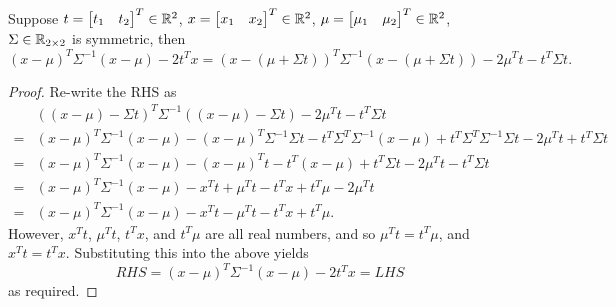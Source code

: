\documentclass[11pt,fleqn]{book} %
\begin{document}
\begin{lemma} \label{lemma:2103}
Suppose \(t = \begin{bmatrix}t_1 & t_2\end{bmatrix}^T \in \mathbb{R}^2\), \(x = \begin{bmatrix}x_1 & x_2\end{bmatrix}^T \in \mathbb{R}^2\), \(\mu = \begin{bmatrix}\mu_1 & \mu_2\end{bmatrix}^T \in \mathbb{R}^2\), \(\Sigma \in \mathbb{R}_{2\times2}\) is symmetric, then
\[
(x - \mu)^T\Sigma^{-1}(x - \mu) - 2t^Tx = (x - (\mu + \Sigma t))^T\Sigma^{-1}(x - (\mu + \Sigma t)) - 2\mu^Tt - t^T\Sigma t.
\]
\end{lemma}
\begin{proof}
Re-write the RHS as
\[
\begin{aligned}
&((x - \mu) - \Sigma t)^T\Sigma^{-1}((x - \mu) - \Sigma t) - 2\mu^T t - t^T\Sigma t \\
= &(x - \mu)^T\Sigma^{-1}(x - \mu) - (x - \mu)^T \Sigma^{-1}\Sigma t - t^T\Sigma^T\Sigma^{-1}(x - \mu) + t^T\Sigma^T\Sigma^{-1}\Sigma t - 2\mu^T t + t^T\Sigma t \\
= &(x - \mu)^T\Sigma^{-1}(x - \mu) - (x - \mu)^T t - t^T(x - \mu) + t^T\Sigma t - 2\mu^T t - t^T\Sigma t \\
= &(x - \mu)^T\Sigma^{-1}(x - \mu) - x^T t + \mu^T t - t^T x + t^T\mu - 2\mu^T t \\
= &(x - \mu)^T\Sigma^{-1}(x - \mu) - x^T t - \mu^T t - t^T x + t^T \mu.
\end{aligned}
\]
\indent However, \(x^T t\), \(\mu^T t\), \(t^T x\), and \(t^T \mu\) are all real numbers, and so \(\mu^T t = t^T \mu\), and \(x^T t = t^T x\). Substituting this into the above yields
\[
RHS = (x - \mu)^T \Sigma^{-1}(x - \mu) - 2t^T x = LHS
\]
as required.
\end{proof}
\end{document}
